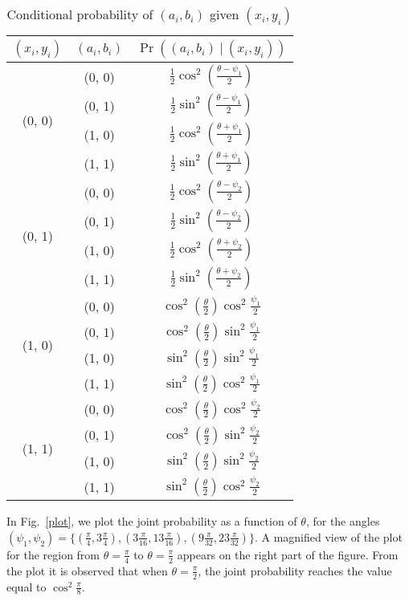 \documentclass[twocolumn,pra,aps,amssymb]{revtex4}
\begin{document}
\begin{table}[htbp]
\caption{Conditional probability of $(a_i, b_i)$ given $(x_i, y_i)$}
\centering
\begin{tabular}{|c|c|c|}
\hline
$(x_i, y_i)$ & $(a_i, b_i)$ &$\Pr\left((a_i,b_i) \ | \ (x_i, y_i)\right)$\\
\hline
\multirow{4}{*}{(0, 0)} & (0, 0) & $\frac{1}{2} \cos^{2}(\frac{\theta-\psi_{1}}{2})$ \\
\cline{2-3}
			& (0, 1) &  $\frac{1}{2} \sin^{2}(\frac{\theta-\psi_{1}}{2})$\\
\cline{2-3}
			& (1, 0) & $\frac{1}{2} \cos^{2}(\frac{\theta+\psi_{1}}{2})$  \\
\cline{2-3}
			& (1, 1) & $\frac{1}{2} \sin^{2}(\frac{\theta+\psi_{1}}{2})$  \\
\hline
\multirow{4}{*}{(0, 1)} & (0, 0) & $\frac{1}{2} \cos^{2}(\frac{\theta-\psi_{2}}{2})$\\
\cline{2-3}
			& (0, 1) &  $\frac{1}{2} \sin^{2}(\frac{\theta-\psi_{2}}{2})$ \\
\cline{2-3}
			& (1, 0) &  $\frac{1}{2} \cos^{2}(\frac{\theta+\psi_{2}}{2})$\\
\cline{2-3}
			& (1, 1) & $\frac{1}{2} \sin^{2}(\frac{\theta+\psi_{2}}{2})$ \\
\hline
\multirow{4}{*}{(1, 0)} & (0, 0) & $\cos^{2}(\frac{\theta}{2})\cos^{2}\frac{\psi_{1}}{2}$\\
\cline{2-3}
			& (0, 1) & $\cos^{2}(\frac{\theta}{2})\sin^{2}\frac{\psi_{1}}{2}$ \\
\cline{2-3}
			& (1, 0) &  $\sin^{2}(\frac{\theta}{2})\sin^{2}\frac{\psi_{1}}{2}$  \\
\cline{2-3}
			& (1, 1) & $\sin^{2}(\frac{\theta}{2})\cos^{2}\frac{\psi_{1}}{2}$\\
\hline
\multirow{4}{*}{(1, 1)} & (0, 0) & $\cos^{2}(\frac{\theta}{2})\cos^{2}\frac{\psi_{2}}{2}$\\
\cline{2-3}
			& (0, 1) & $\cos^{2}(\frac{\theta}{2})\sin^{2}\frac{\psi_{2}}{2}$\\
\cline{2-3}
			& (1, 0) & $\sin^{2}(\frac{\theta}{2})\sin^{2}\frac{\psi_{2}}{2}$ \\
\cline{2-3}
			& (1, 1) & $\sin^{2}(\frac{\theta}{2})\cos^{2}\frac{\psi_{2}}{2}$ \\
\hline
\end{tabular}
\label{tab1}
\end{table}

In Fig.~\ref{plot}, we plot the joint probability as a function of $\theta$, for the angles $(\psi_1,\psi_2)=\{(\frac{\pi}{4},3\frac{\pi}{4}), (3\frac{\pi}{16},13\frac{\pi}{16}), (9\frac{\pi}{32},23\frac{\pi}{32})\}$. A magnified view of the plot for the region from $\theta=\frac{\pi}{4}$ to $\theta=\frac{\pi}{2}$ appears on the right part of the figure. From the plot it is observed that when $\theta=\frac{\pi}{2}$, the joint probability reaches the value equal to $\cos^2{\frac{\pi}{8}}$. 
\end{document}
